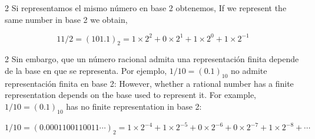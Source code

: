 \begin{paracol}{2}
Si representamos el mismo número en base 2 obtenemos,
\switchcolumn
If we represent the same number in base 2 we obtain,
\end{paracol}
\begin{equation*}
11/2=(101.1)_2=1\times2^2+0\times2^1+1\times2^0+1\times2^{-1}
\end{equation*}
\begin{paracol}{2}
Sin embargo, que un número racional admita una representación finita depende de la base en que se representa. Por ejemplo, $1/10=(0.1)_{10}$ no admite representación finita en base 2:
\switchcolumn
However, whether a rational number has a finite representation depends on the base used to represent it. For example, $1/10=(0.1)_{10}$ has no finite representation in base 2:
\end{paracol}
\begin{equation*}
1/10=(0.0001100110011\cdots)_2 =1\times2^{-4}+1\times2^{-5}+0\times2^{-6}+0\times2^{-7}+1\times2^{-8}+\cdots
\end{equation*}
